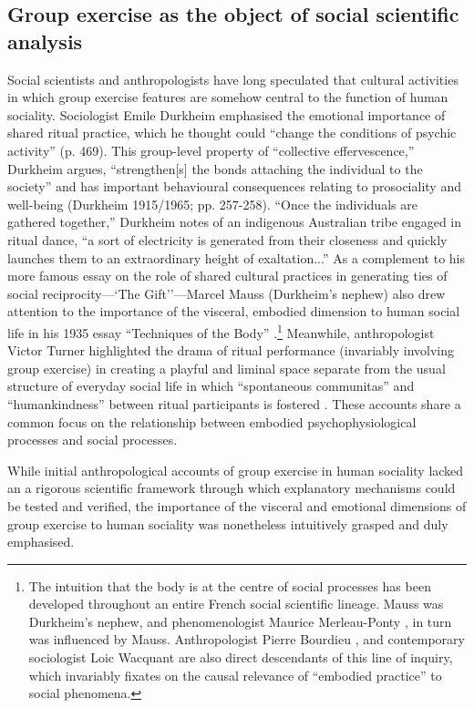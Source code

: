 \begin{CJK}{UTF8}{gbsn}
\subsection{Group exercise as the object of social scientific analysis\label{sect:GEsoSci}}
Social scientists and anthropologists have long speculated that cultural activities in which group exercise features are somehow central to the function of human sociality.  Sociologist Emile Durkheim emphasised the emotional importance of shared ritual practice, which he thought could ``change the conditions of psychic activity'' (p. 469).  This group-level property of ``collective effervescence,'' Durkheim argues, ``strengthen[s] the bonds attaching the individual to the society'' and has important behavioural consequences relating to prosociality and well-being (Durkheim 1915/1965; pp. 257-258). ``Once the individuals are gathered together,'' Durkheim notes of an indigenous Australian tribe engaged in ritual dance, ``a sort of electricity is generated from their closeness and quickly launches them to an extraordinary height of exaltation...''  As a complement to his more famous essay on the role of shared cultural practices in generating ties of social reciprocity---`The Gift''---Marcel Mauss (Durkheim's nephew) also drew attention to the importance of the visceral, embodied dimension to human social life in his 1935 essay ``Techniques of the Body'' \citep{Mauss1935}.\footnote{The intuition that the body is at the centre of social processes has been developed throughout an entire French social scientific lineage.  Mauss was Durkheim's nephew, and phenomenologist Maurice Merleau-Ponty \citep{Merleau-Ponty1956}, in turn was influenced by Mauss.  Anthropologist Pierre Bourdieu \citep{Bourdieu1990}, and contemporary sociologist Loic Wacquant \citep{Wacquant2004} are also direct descendants of this line of inquiry, which invariably fixates on the causal relevance of ``embodied practice'' to social phenomena.}
Meanwhile, anthropologist Victor Turner highlighted the drama of ritual performance (invariably involving group exercise) in creating a playful and liminal space separate from the usual structure of everyday social life in which ``spontaneous communitas'' and ``humankindness'' between ritual participants is fostered \citep{Turner1974}.  These accounts share a common focus on the relationship between embodied psychophysiological processes and social processes.

While initial anthropological accounts of group exercise in human sociality lacked an a rigorous scientific framework through which explanatory mechanisms could be tested and verified, the importance of the visceral and emotional dimensions of group exercise to human sociality was nonetheless intuitively grasped and duly emphasised.


\end{CJK}
